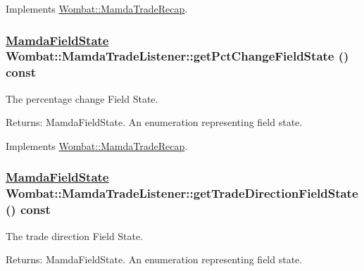 Implements \hyperlink{classWombat_1_1MamdaTradeRecap_d9ba46964e6719b4a53c2d9abcf30314}{Wombat::Mamda\-Trade\-Recap}.\hypertarget{classWombat_1_1MamdaTradeListener_43832d2f10f4757e6ed29c82f875c976}{
\subsubsection[getPctChangeFieldState]{\setlength{\rightskip}{0pt plus 5cm}\hyperlink{namespaceWombat_93aac974f2ab713554fd12a1fa3b7d2a}{Mamda\-Field\-State} Wombat::Mamda\-Trade\-Listener::get\-Pct\-Change\-Field\-State () const}}
\label{classWombat_1_1MamdaTradeListener_43832d2f10f4757e6ed29c82f875c976}


The percentage change Field State. 

\begin{Desc}
\item[Returns:]Mamda\-Field\-State. An enumeration representing field state. \end{Desc}


Implements \hyperlink{classWombat_1_1MamdaTradeRecap_83948885b739f36f7e593d8923cb542f}{Wombat::Mamda\-Trade\-Recap}.\hypertarget{classWombat_1_1MamdaTradeListener_0662220b81bda7b4fe9532ff4c15f3c8}{
\subsubsection[getTradeDirectionFieldState]{\setlength{\rightskip}{0pt plus 5cm}\hyperlink{namespaceWombat_93aac974f2ab713554fd12a1fa3b7d2a}{Mamda\-Field\-State} Wombat::Mamda\-Trade\-Listener::get\-Trade\-Direction\-Field\-State () const}}
\label{classWombat_1_1MamdaTradeListener_0662220b81bda7b4fe9532ff4c15f3c8}


The trade direction Field State. 

\begin{Desc}
\item[Returns:]Mamda\-Field\-State. An enumeration representing field state. \end{Desc}


